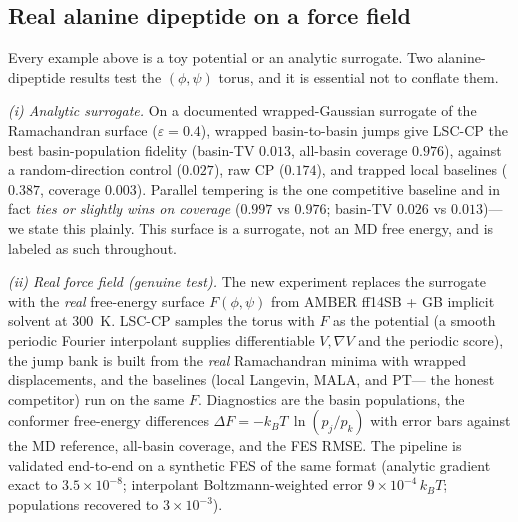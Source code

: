\subsection{Real alanine dipeptide on a force field}
Every example above is a toy potential or an analytic surrogate. Two alanine-dipeptide results test
the $(\phi,\psi)$ torus, and it is essential not to conflate them.

\emph{(i) Analytic surrogate.} On a documented wrapped-Gaussian surrogate of the Ramachandran
surface ($\varepsilon=0.4$), wrapped basin-to-basin jumps give LSC-CP the best basin-population
fidelity (basin-TV $0.013$, all-basin coverage $0.976$), against a random-direction control
($0.027$), raw CP ($0.174$), and trapped local baselines ($0.387$, coverage $0.003$). Parallel
tempering is the one competitive baseline and in fact \emph{ties or slightly wins on coverage}
($0.997$ vs $0.976$; basin-TV $0.026$ vs $0.013$)---we state this plainly. This surface is a
surrogate, not an MD free energy, and is labeled as such throughout.

\emph{(ii) Real force field (genuine test).} The new experiment replaces the surrogate with the
\emph{real} free-energy surface $F(\phi,\psi)$ from AMBER ff14SB + GB implicit solvent at $300$~K.
LSC-CP samples the torus with $F$ as the potential (a smooth periodic Fourier interpolant supplies
differentiable $V,\nabla V$ and the periodic score), the jump bank is built from the \emph{real}
Ramachandran minima with wrapped displacements, and the baselines (local Langevin, MALA, and PT---
the honest competitor) run on the same $F$. Diagnostics are the basin populations, the conformer
free-energy differences $\Delta F=-k_BT\,\ln(p_j/p_k)$ with error bars against the MD reference,
all-basin coverage, and the FES RMSE. The pipeline is validated end-to-end on a synthetic FES of
the same format (analytic gradient exact to $3.5\times10^{-8}$; interpolant Boltzmann-weighted error
$9\times10^{-4}\,k_BT$; populations recovered to $3\times10^{-3}$).
